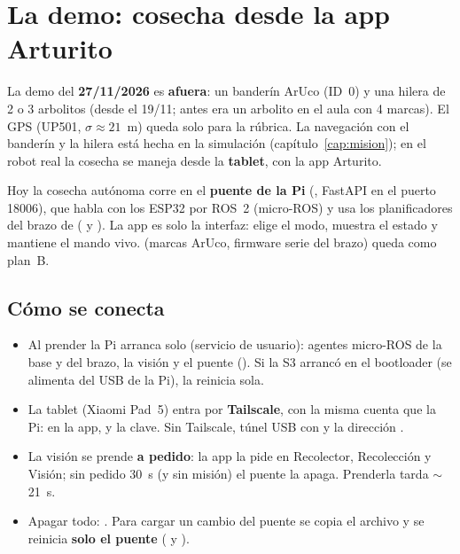 \chapter{La demo: cosecha desde la app Arturito}\label{cap:demo}

La demo del \textbf{27/11/2026} es \textbf{afuera}: un banderín ArUco (ID~0) y una hilera de 2 o 3 arbolitos (desde el
19/11; antes era un arbolito en el aula con 4 marcas). El GPS (UP501, $\sigma \approx 21$~m) queda solo para la
rúbrica. La navegación con el banderín y la hilera está hecha en la simulación (capítulo~\ref{cap:mision}); en el
robot real la cosecha se maneja desde la \textbf{tablet}, con la app Arturito.

\begin{idea}
Hoy la cosecha autónoma corre en el \textbf{puente de la Pi} (, FastAPI en el puerto
18006), que habla con los ESP32 por ROS~2 (micro-ROS) y usa los planificadores del brazo de 
( y ). La app es solo la
interfaz: elige el modo, muestra el estado y mantiene el mando vivo.  (marcas ArUco, firmware
serie del brazo) queda como plan~B.
\end{idea}

\section{Cómo se conecta}

\begin{itemize}
  \item Al prender la Pi arranca solo  (servicio de usuario): agentes micro-ROS de la base y
        del brazo, la visión y el puente (). Si la S3 arrancó en el bootloader (se alimenta
        del USB de la Pi), la reinicia sola.
  \item La tablet (Xiaomi Pad~5) entra por \textbf{Tailscale}, con la misma cuenta que la Pi: en la app,
         y la clave. Sin Tailscale, túnel USB con
         y la dirección .
  \item La visión se prende \textbf{a pedido}: la app la pide en Recolector, Recolección y Visión; sin pedido 30~s (y
        sin misión) el puente la apaga. Prenderla tarda $\sim$21~s.
  \item Apagar todo: . Para cargar un cambio del puente se copia el archivo y se
        reinicia \textbf{solo el puente} ( y ).
\end{itemize}

